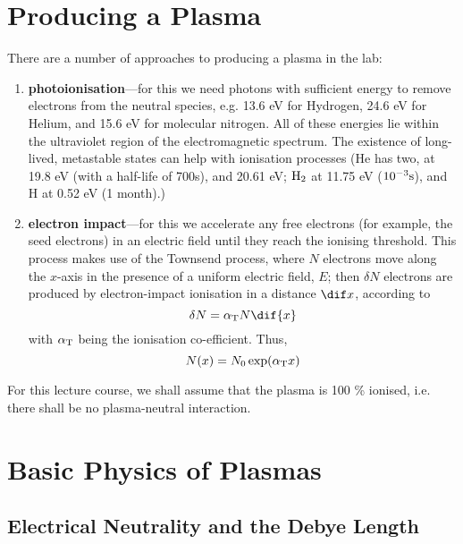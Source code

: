 \documentclass{book}         		                %
\begin{document}
\section{Producing a Plasma}
\label{sec:production}

There are a number of approaches to producing a plasma in the lab:
\begin{enumerate}
\item \textbf{photoionisation}---for this we need photons with
  sufficient energy to remove electrons from the neutral species,
  e.g. 13.6 eV for Hydrogen, 24.6 eV for Helium, and 15.6 eV for
  molecular nitrogen. All of these energies lie within the ultraviolet
  region of the electromagnetic spectrum. The existence of long-lived,
  metastable states can help with ionisation processes (He has two, at
  19.8 eV (with a half-life of 700s), and 20.61 eV; ${\rm H}_{2}$ at
  11.75 eV ($10^{-3} {\rm s}$), and H at 0.52 eV (1 month).)
\item \textbf{electron impact}---for this we accelerate any free
  electrons (for example, the seed electrons) in an electric field
  until they reach the ionising threshold. This process makes use of
  the Townsend process, where $N$ electrons move along the $x$-axis in
  the presence of a uniform electric field, $E$; then $\delta N$
  electrons are produced by electron-impact ionisation in a distance
  $\dif x$, according to
  \begin{equation}
    \label{eq:townsend}
    \delta N = \alpha_{{\rm T}} N \dif{x}
  \end{equation}
  with $\alpha_{{\rm T}}$ being the ionisation co-efficient.
  Thus,
  \begin{equation}
    \label{eq:townsendint}
    N(x) = N_0 \exp(\alpha_{\rm T} x)
  \end{equation}
\end{enumerate}
For this lecture course, we shall assume that the plasma is 100 \% ionised, i.e. there shall be no plasma-neutral interaction.\\

\section{Basic Physics of Plasmas}
\label{sec:basic-phys-plasm}

\subsection{Electrical Neutrality and the Debye Length}
\label{sec:neutralanddebye}
\end{document}

